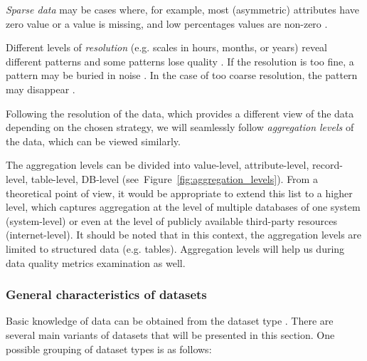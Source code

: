 				\emph{Sparse data} may be cases where, for example, most (asymmetric) attributes have zero value or a value is missing, and low percentages values are non-zero \cite{Tan2013}. 
				
				Different levels of \emph{resolution} (e.g. scales in hours, months, or years) reveal different patterns and some patterns lose quality \cite{Tan2013}. If the resolution is too fine, a pattern may be buried in noise \cite{Tan2013}. In the case of too coarse resolution, the pattern may disappear \cite{Tan2013}.	
				
				Following the resolution of the data, which provides a different view of the data depending on the chosen strategy, we will seamlessly follow \emph{aggregation levels} of the data, which can be viewed similarly.

				The aggregation levels can be divided into value-level, attribute-level, record-level, table-level, DB-level (see~Figure~\ref{fig:aggregation_levels}). From a theoretical point of view, it would be appropriate to extend this list to a higher level, which captures aggregation at the level of multiple databases of one system (system-level) or even at the level of publicly available third-party resources (internet-level). It should be noted that in this context, the aggregation levels are limited to structured data (e.g. tables). Aggregation levels will help us during data quality metrics examination  as well.

			
			
			\subsubsection{General characteristics of datasets}
			\label{subsec:general_characteristics_of_data_sets}
			
				Basic knowledge of data can be obtained from the dataset type \cite{Tan2013}. There are several main variants of datasets that will be presented in this section. One possible grouping of dataset types is as follows:			
			
